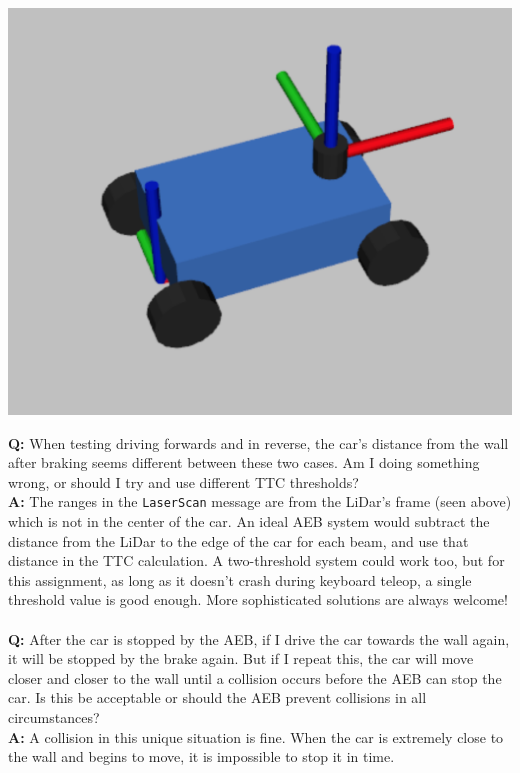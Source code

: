 \documentclass[letta4 paper]{article}
\numberwithin{equation}{section}
\newcommand{\0}{\mathbf{0}}
\begin{document}
	\begin{center}
		\includegraphics[scale=0.25]{car.png}
	\end{center}
	
	\noindent \textbf{Q:} When testing driving forwards and in reverse, the car’s distance from the wall after braking seems different between these two cases. Am I doing something wrong, or should I try and use different TTC thresholds?\\
	\textbf{A:} The ranges in the \texttt{LaserScan} message are from the LiDar’s frame (seen above) which is not in the center of the car. An ideal AEB system would subtract the distance from the LiDar to the edge of the car for each beam, and use that distance in the TTC calculation. A two-threshold system could work too, but for this assignment, as long as it doesn’t crash during keyboard teleop, a single threshold value is good enough. More sophisticated solutions are always welcome!
	\\
	\\
	\textbf{Q:} After the car is stopped by the AEB, if I drive the car towards the wall again, it will be stopped by the brake again. But if I repeat this, the car will move closer and closer to the wall until a collision occurs before the AEB can stop the car. Is this be acceptable or should the AEB prevent collisions in all circumstances?\\
	\textbf{A:} A collision in this unique situation is fine. When the car is extremely close to the wall and begins to move, it is impossible to stop it in time.	
		
		
			
\end{document}
